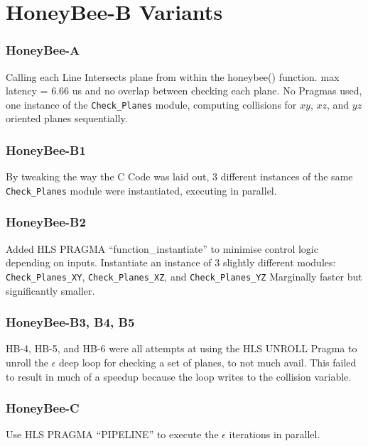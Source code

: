 \section{HoneyBee-B Variants}
\label{section:honeybee_appendix_hbb_variants}
    \subsubsection{HoneyBee-A}
    Calling each Line Intersects plane from within the honeybee() function. 
    max latency = 6.66 us and no overlap between checking each plane.
    No Pragmas used, one instance of the \texttt{Check\_Planes} module, computing collisions for $xy$, $xz$, and $yz$ oriented planes sequentially.

    \subsubsection{HoneyBee-B1}
    By tweaking the way the C Code was laid out, 3 different instances of the same \texttt{Check\_Planes} module were instantiated, executing in parallel.

    \subsubsection{HoneyBee-B2}
    Added HLS PRAGMA ``function\_instantiate'' to minimise control logic depending on inputs. Instantiate an instance of 3 slightly different modules: \texttt{Check\_Planes\_XY}, \texttt{Check\_Planes\_XZ}, and \texttt{Check\_Planes\_YZ}
    Marginally faster but significantly smaller.

    \subsubsection{HoneyBee-B3, B4, B5}
    HB-4, HB-5, and HB-6 were all attempts at using the HLS UNROLL Pragma to unroll the $\epsilon$ deep loop for checking a set of planes, to not much avail. This failed to result in much of a speedup because the loop writes to the collision variable. 

    \subsubsection{HoneyBee-C}
    Use HLS PRAGMA ``PIPELINE'' to execute the $\epsilon$ iterations in parallel.
